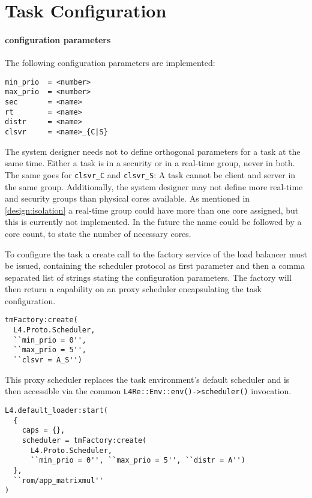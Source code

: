 \section{Task Configuration}
\label{impl:config}

\paragraph{configuration parameters}
The following configuration parameters are implemented:

\begin{lstlisting}[language={[5.2]Lua}]
min_prio  = <number>
max_prio  = <number>
sec       = <name>
rt        = <name>
distr     = <name>
clsvr     = <name>_{C|S}
\end{lstlisting}

The system designer needs not to define orthogonal parameters for
a task at the same time.
Either a task is in a security or in a real-time group, never in both.
The same goes for \texttt{clsvr\_C} and \texttt{clsvr\_S}:
A task cannot be client and server in the same group.
Additionally, the system designer may not define more real-time and security
groups than physical cores available.
As mentioned in \ref{design:isolation} a real-time group could have more than
one core assigned, but this is currently not implemented.
In the future the name could be followed by a core count, to state the number
of necessary cores.

To configure the task a create call to the factory service of the load
balancer must be issued, containing the scheduler protocol as first parameter
and then a comma separated list of strings stating the configuration
parameters.
The factory will then return a capability on an proxy scheduler encapsulating
the task configuration.

\begin{lstlisting}[language={[5.2]Lua}]
tmFactory:create(
  L4.Proto.Scheduler,
  ``min_prio = 0'',
  ``max_prio = 5'',
  ``clsvr = A_S'')
\end{lstlisting}

This proxy scheduler replaces the task environment's default scheduler and is
then accessible via the common \texttt{L4Re::Env::env()->scheduler()} invocation.

\begin{lstlisting}[language={[5.2]Lua}]
L4.default_loader:start(
  {
    caps = {},
    scheduler = tmFactory:create(
      L4.Proto.Scheduler,
      ``min_prio = 0'', ``max_prio = 5'', ``distr = A'')
  },
  ``rom/app_matrixmul''
)
\end{lstlisting}

